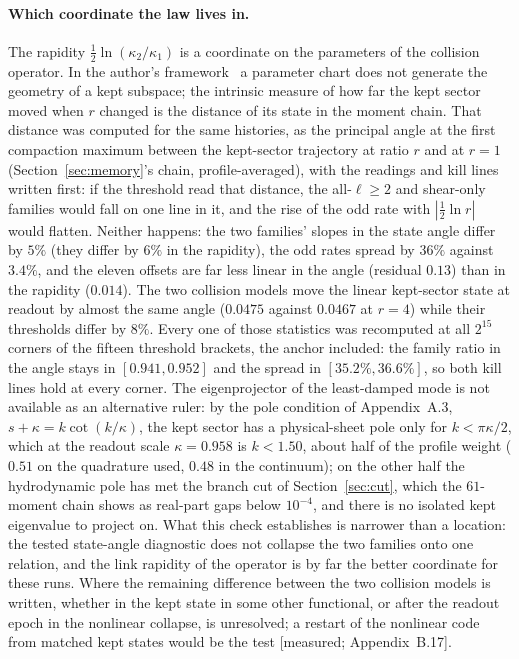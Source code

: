 \documentclass[11pt]{article}
\newcommand{\grade}[1]{\textsf{\small[#1]}}
\begin{document}
\paragraph{Which coordinate the law lives in.} The rapidity $\tfrac12\ln(\kappa_2/\kappa_1)$ is a coordinate on the parameters of the collision operator. In the author's framework~\cite{IQGT} a parameter chart does not generate the geometry of a kept subspace; the intrinsic measure of how far the kept sector moved when $r$ changed is the distance of its state in the moment chain. That distance was computed for the same histories, as the principal angle at the first compaction maximum between the kept-sector trajectory at ratio $r$ and at $r=1$ (Section~\ref{sec:memory}'s chain, profile-averaged), with the readings and kill lines written first: if the threshold read that distance, the all-$\ell\ge2$ and shear-only families would fall on one line in it, and the rise of the odd rate with $|\tfrac12\ln r|$ would flatten. Neither happens: the two families' slopes in the state angle differ by $5\%$ (they differ by $6\%$ in the rapidity), the odd rates spread by $36\%$ against $3.4\%$, and the eleven offsets are far less linear in the angle (residual $0.13$) than in the rapidity ($0.014$). The two collision models move the linear kept-sector state at readout by almost the same angle ($0.0475$ against $0.0467$ at $r=4$) while their thresholds differ by $8\%$. Every one of those statistics was recomputed at all $2^{15}$ corners of the fifteen threshold brackets, the anchor included: the family ratio in the angle stays in $[0.941,0.952]$ and the spread in $[35.2\%,36.6\%]$, so both kill lines hold at every corner. The eigenprojector of the least-damped mode is not available as an alternative ruler: by the pole condition of Appendix~A.3, $s+\kappa=k\cot(k/\kappa)$, the kept sector has a physical-sheet pole only for $k<\pi\kappa/2$, which at the readout scale $\kappa=0.958$ is $k<1.50$, about half of the profile weight ($0.51$ on the quadrature used, $0.48$ in the continuum); on the other half the hydrodynamic pole has met the branch cut of Section~\ref{sec:cut}, which the $61$-moment chain shows as real-part gaps below $10^{-4}$, and there is no isolated kept eigenvalue to project on. What this check establishes is narrower than a location: the tested state-angle diagnostic does not collapse the two families onto one relation, and the link rapidity of the operator is by far the better coordinate for these runs. Where the remaining difference between the two collision models is written, whether in the kept state in some other functional, or after the readout epoch in the nonlinear collapse, is unresolved; a restart of the nonlinear code from matched kept states would be the test \grade{measured; Appendix~B.17}.
\end{document}
